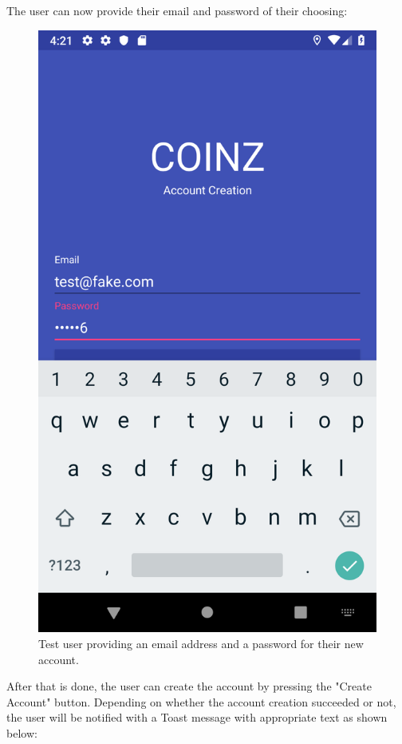 \documentclass[11pt,a4paper,notitlepage]{article}
\begin{document}
    The user can now provide their email and password of their choosing:

\begin{figure}[H]
    \centering
    \includegraphics[scale=0.25]{screenshots/account-creation/account-creation-creating-account.png}
    \caption{Test user providing an email address and a password for their new account.}
\end{figure}

    After that is done, the user can create the account by pressing the "Create Account" button. Depending on whether the account creation succeeded or not, the user will be notified with a Toast message with appropriate text as shown below:
\end{document}
